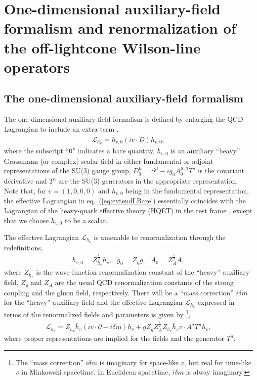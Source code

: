 \section{One-dimensional auxiliary-field formalism and renormalization of the off-lightcone Wilson-line operators}
\label{sec:EFT}
\subsection{The one-dimensional auxiliary-field formalism}
The one-dimensional auxiliary-field formalism is defined by enlarging the QCD Lagrangian to include an extra term \cite{Dorn:1986dt},
\begin{eqnarray}
\label{eq:extendLBare}
\mathcal{L}_{h_v} =\bar{h}_{v, 0} (iv\cdot D) h_{v, 0}, 
\end{eqnarray}
where the subscript ``$0$”  indicates a bare quantity, $h_{v, 0}$ is an auxiliary ``heavy”  Grassmann (or complex) scalar field in either fundamental or adjoint representations of the SU($3$) gauge group, $D_0^{\mu} = \partial^{\mu} - ig_{0}A_0^{\mu, a}T^a$ is the  covariant derivative and $T^a$ are the SU($3$) generators in the appropriate representation. Note that, for $v=(1,0,0,0)$ and $h_{v, 0}$ being in the fundamental representation, the effective Lagrangian in eq.~(\ref{eq:extendLBare}) essentially coincides with the Lagrangian of the heavy-quark effective theory (HQET) in the rest frame \cite{Eichten:1989zv}, except that we choose $h_{v, 0}$ to be a  scalar.

The effective Lagrangian $\mathcal{L}_{h_v}$ is amenable to renormalization through the redefinitions,
\begin{eqnarray}
h_{v, 0} = Z_{h_v}^{\frac{1}{2}} h_v,\, \, \, \, g_0 =Z_g g,\, \, \, \,   A_0 = Z_A^{\frac{1}{2}} A,
\end{eqnarray}
where  $Z_{h_v}$ is the wave-function renormalization constant of the ``heavy” auxiliary field, $Z_g$ and $Z_A$ are the usual QCD renormalization constants of the strong coupling and the gluon field, respectively. There will be a ``mass correction” $i\delta m$ for the ``heavy” auxiliary field and the effective Lagrangian $\mathcal{L}_{h_v} $ expressed in terms of  the renormalized fields and parameters is given by \footnote{The ``mass correction” $i\delta m$ is imaginary for space-like $v$, but real for time-like $v$ in Minkowski spacetime. In Euclidean spacetime,  $i\delta m$ is alway  imaginary. },
\begin{eqnarray}
\label{eq:extendLRen}
\mathcal{L}_{h_v} =Z_{h_v}\bar{h}_v (iv\cdot \partial - i\delta m) h_v + gZ_gZ_A^{\frac{1}{2}}Z_{h_v} \bar{h}_v v\cdot A^{a}T^a h_v,
\end{eqnarray}
where proper representations are implied for the fields and the generator $T^a$. 

